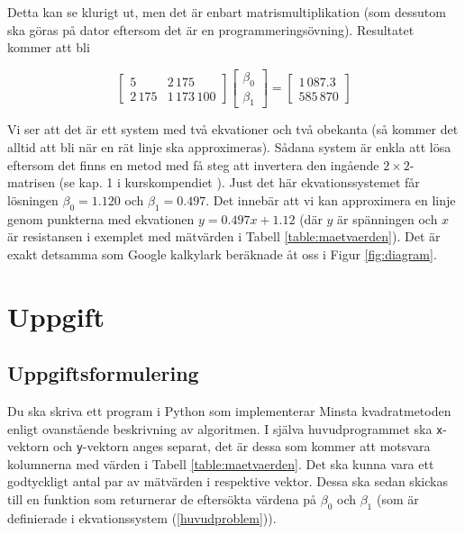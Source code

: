 \documentclass[titlepage, 10pt]{article}
\begin{document}
Detta kan se klurigt ut, men det är enbart matrismultiplikation (som dessutom
ska göras på dator eftersom det är en programmeringsövning). Resultatet kommer
att bli

\begin{equation}
  \begin{bmatrix}
    5 & 2\,175 \\
    2\,175 & 1\,173\,100
  \end{bmatrix}
  \begin{bmatrix}
    \beta_0 \\ \beta_1
  \end{bmatrix}
  =
  \begin{bmatrix}
    1\,087.3 \\ 585\,870
  \end{bmatrix}
\end{equation}

Vi ser att det är ett system med två ekvationer och två obekanta (så kommer det
alltid att bli när en rät linje ska approximeras). Sådana system är enkla att
lösa eftersom det finns en metod med få steg att invertera den ingående
$2\times 2$-matrisen (se kap. 1 i kurskompendiet
\cite{Linalgkompendium:1}). Just det här
ekvationssystemet får lösningen $\beta_0=1.120$ och $\beta_1=0.497$. Det innebär
att vi kan approximera en linje genom punkterna med ekvationen $y=0.497x+1.12$
(där $y$ är spänningen och $x$ är resistansen i exemplet med mätvärden i Tabell
\ref{table:maetvaerden}). Det är exakt detsamma som Google kalkylark beräknade
åt oss i Figur \ref{fig:diagram}.

\section{Uppgift}
\subsection{Uppgiftsformulering}
Du ska skriva ett program i Python som implementerar Minsta kvadratmetoden
enligt ovanstående beskrivning av algoritmen.
I själva huvudprogrammet ska \texttt{x}-vektorn och \texttt{y}-vektorn anges
separat, det är dessa som kommer att motsvara kolumnerna med värden i Tabell
\ref{table:maetvaerden}.
Det ska kunna vara ett godtyckligt antal par av mätvärden i respektive vektor.
Dessa ska sedan skickas till en funktion som returnerar de eftersökta värdena på
$\beta_0$ och $\beta_1$ (som är definierade i ekvationssystem
(\ref{huvudproblem})).
\end{document}
